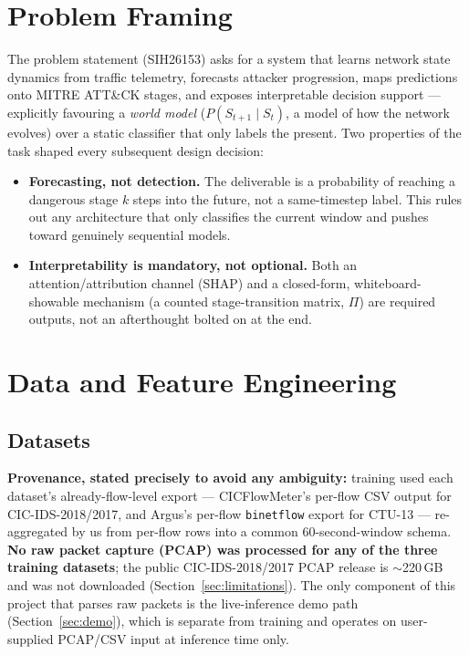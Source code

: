 \documentclass[11pt]{article}
\newcommand{\code}[1]{\texttt{#1}}
\begin{document}
\tableofcontents
\newpage

\section{Problem Framing}

The problem statement (SIH26153) asks for a system that learns network state dynamics from
traffic telemetry, forecasts attacker progression, maps predictions onto MITRE ATT\&CK stages,
and exposes interpretable decision support --- explicitly favouring a \emph{world model}
(\(P(S_{t+1} \mid S_t)\), a model of how the network evolves) over a static classifier that only
labels the present. Two properties of the task shaped every subsequent design decision:

\begin{itemize}[leftmargin=1.5em]
  \item \textbf{Forecasting, not detection.} The deliverable is a probability of reaching a
  dangerous stage \(k\) steps into the future, not a same-timestep label. This rules out any
  architecture that only classifies the current window and pushes toward genuinely sequential
  models.
  \item \textbf{Interpretability is mandatory, not optional.} Both an attention/attribution
  channel (SHAP) and a closed-form, whiteboard-showable mechanism (a counted stage-transition
  matrix, \(\Pi\)) are required outputs, not an afterthought bolted on at the end.
\end{itemize}

\section{Data and Feature Engineering}

\subsection{Datasets}

\textbf{Provenance, stated precisely to avoid any ambiguity:} training used each dataset's
already-flow-level export --- CICFlowMeter's per-flow CSV output for CIC-IDS-2018/2017, and
Argus's per-flow \code{binetflow} export for CTU-13 --- re-aggregated by us from per-flow rows
into a common 60-second-window schema. \textbf{No raw packet capture (PCAP) was processed for
any of the three training datasets}; the public CIC-IDS-2018/2017 PCAP release is
$\sim$220\,GB and was not downloaded (Section~\ref{sec:limitations}). The only component of
this project that parses raw packets is the live-inference demo path
(Section~\ref{sec:demo}), which is separate from training and operates on user-supplied
PCAP/CSV input at inference time only.
\end{document}
